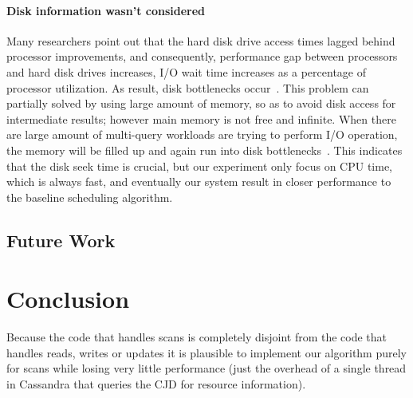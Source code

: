 \paragraph{Disk information wasn’t considered}
    	Many researchers point out that the hard disk drive access times lagged behind processor improvements, and consequently, performance gap between processors and hard disk drives increases, I/O wait time increases as a percentage of processor utilization. As result, disk bottlenecks occur~\cite{IBM-IO, TMS-SSD}. This problem can partially solved by using large amount of memory, so as to avoid disk access for intermediate results; however main memory is not free and infinite. When there are large amount of multi-query workloads are trying to perform I/O operation, the memory will be filled up and again run into disk bottlenecks~\cite{Bouganim:1998:MSL:288627.288646}. This indicates that the disk seek time is crucial, but our experiment only focus on CPU time, which is always fast, and eventually our system result in closer performance to the baseline scheduling algorithm.

\subsection{Future Work}

\section{Conclusion}
\label{sec:conclusion}

Because the code that handles scans is completely disjoint from the code that handles reads, writes or updates it is plausible to implement our algorithm purely for scans while losing very little performance (just the overhead of a single thread in Cassandra that queries the CJD for resource information).
